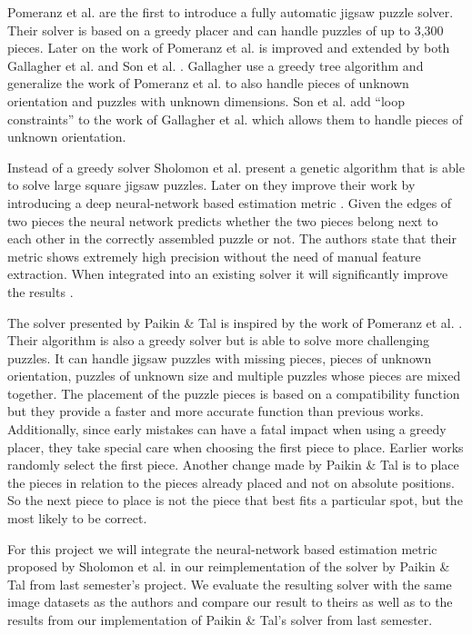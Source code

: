 \documentclass[11pt]{report}
\begin{document}
Pomeranz et al.\cite{Pomeranz2011} are the first to introduce a fully automatic
jigsaw puzzle solver. Their solver is based on a greedy placer and can handle
puzzles of up to 3,300 pieces. Later on the work of Pomeranz et al. is improved
and extended by both Gallagher et al. \cite{gallagher2012jigsaw} and Son et al.
\cite{son2014solving}. Gallagher use a greedy tree algorithm and generalize the
work of Pomeranz et al. to also handle pieces of unknown orientation and puzzles
with unknown dimensions. Son et al. add ``loop constraints'' to the work of
Gallagher et al. which allows them to handle pieces of unknown orientation.

Instead of a greedy solver Sholomon et al. \cite{sholomon2013genetic} present a
genetic algorithm that is able to solve large square jigsaw puzzles. Later on
they improve their work by introducing a deep neural-network based estimation
metric \cite{sholomon2016dnn}. Given the edges of two pieces the neural network
predicts whether the two pieces belong next to each other in the correctly
assembled puzzle or not. The authors state that their metric shows
extremely high precision without the need of manual feature extraction. When
integrated into an existing solver it will significantly improve the results
\cite{sholomon2016dnn}. 

The solver presented by Paikin \& Tal \cite{Paikin2015} is inspired by the work
of Pomeranz et al. \cite{Pomeranz2011}. Their algorithm is also a greedy solver
but is able to solve more challenging puzzles. It can handle jigsaw puzzles with
missing pieces, pieces of unknown orientation, puzzles of unknown size and
multiple puzzles whose pieces are mixed together. The placement of the puzzle
pieces is based on a compatibility function but they provide a faster and more
accurate function than previous works. Additionally, since early mistakes can
have a fatal impact when using a greedy placer, they take special care when
choosing the first piece to place. Earlier works randomly select the first
piece. Another change made by Paikin \& Tal is to place the pieces in relation
to the pieces already placed and not on absolute positions. So the next piece to
place is not the piece that best fits a particular spot, but the most likely to
be correct.

For this project we will integrate the neural-network based estimation metric
proposed by Sholomon et al. \cite{sholomon2016dnn} in our reimplementation of the
solver by Paikin \& Tal \cite{Paikin2015} from last semester's project. We evaluate the resulting
solver with the same image datasets as the authors and compare our result to
theirs as well as to the results from our implementation of Paikin \& Tal's
solver from last semester.


\end{document}
